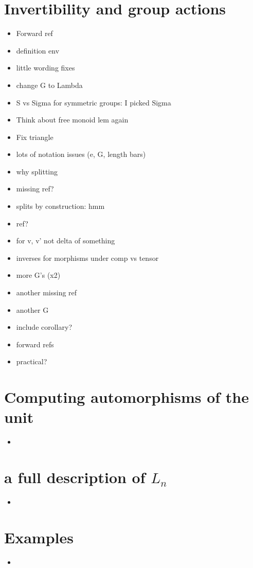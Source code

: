 \documentclass{amsart}
\begin{document}
\section{ Invertibility and group actions}
\begin{itemize}
\item Forward ref
\item definition env
\item little wording fixes
\item change G to Lambda
\item S vs Sigma for symmetric groups: I picked Sigma
\item Think about free monoid lem again
\item Fix triangle
\item lots of notation issues (e, G, length bars)
\item why splitting
\item missing ref?
\item splits by construction: hmm
\item ref?
\item for v, v' not delta of something
\item inverses for morphisms under comp vs tensor
\item more G's (x2)
\item another missing ref
\item another G
\item include corollary? 
\item forward refs
\item practical?
\end{itemize}

\section{ Computing automorphisms of the unit}
\begin{itemize}
\item

\end{itemize}

\section{a full description of $L_n $}
\begin{itemize}
\item 
\end{itemize}
\section{ Examples}
\begin{itemize}
\item 
\end{itemize}
\end{document}
